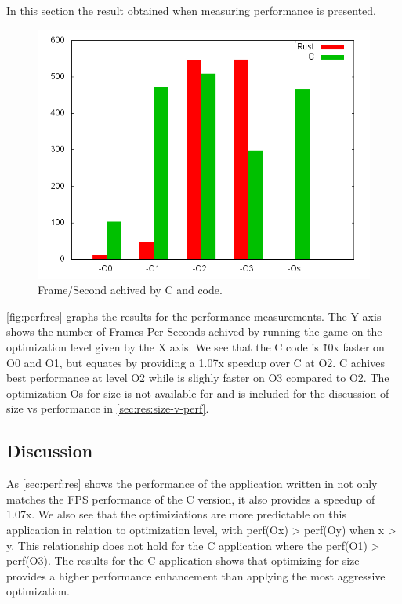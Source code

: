 In this section the result obtained when measuring performance is presented.

\begin{figure}[H]
  \begin{center}
    \includegraphics[scale=0.5]{results/plots/perf/perf.png}
  \end{center}
  \caption{Frame/Second achived by C and {\rust} code.}
  \label{fig:perf:res}
\end{figure}

\autoref{fig:perf:res} graphs the results for the performance measurements.
The Y axis shows the number of Frames Per Seconds achived by running the game on the optimization level given by the X axis.
We see that the C code is \~10x faster on O0 and O1, but {\rust} equates by providing a 1.07x speedup over C at O2.
C achives best performance at level O2 while {\rust} is slighly faster on O3 compared to O2.
The optimization Os for size is not available for {\rust} and is included for the discussion of size vs performance in \autoref{sec:res:size-v-perf}.

\subsection{Discussion}
\label{sec:perf:disc}
As \autoref{sec:perf:res} shows the performance of the application written in {\rust} not only matches the FPS performance of the C version, it also provides a speedup of 1.07x.
We also see that the optimiziations are more predictable on this application in relation to optimization level, with perf(Ox) > perf(Oy) when x > y.
This relationship does not hold for the C application where the perf(O1) > perf(O3).
The results for the C application shows that optimizing for size provides a higher performance enhancement than applying the most aggressive optimization.

